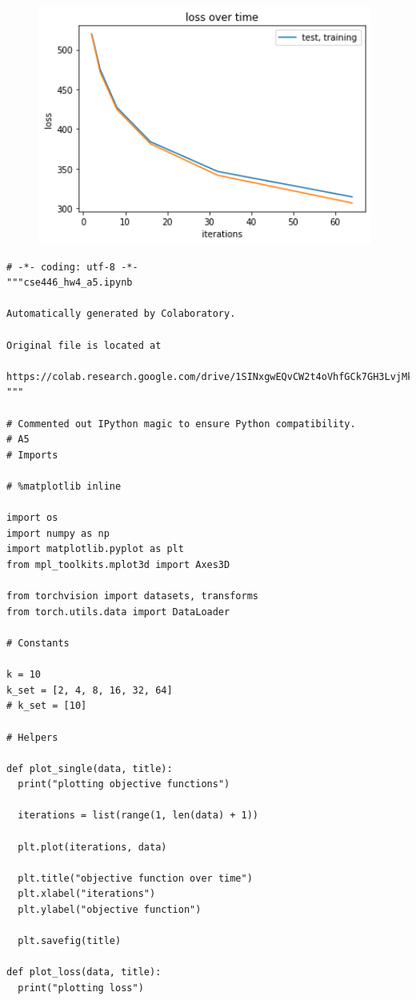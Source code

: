 \documentclass{article}
\newcommand{\1}{\mathbf{1}}
\begin{document}
{\begin{figure}[!hb]
  \centering
  \includegraphics[width=110mm]{../hw4-code/results/a5_c.png}
\end{figure}

\newpage

\begin{verbatim}
# -*- coding: utf-8 -*-
"""cse446_hw4_a5.ipynb

Automatically generated by Colaboratory.

Original file is located at
    https://colab.research.google.com/drive/1SINxgwEQvCW2t4oVhfGCk7GH3LvjMkmZ
"""

# Commented out IPython magic to ensure Python compatibility.
# A5
# Imports

# %matplotlib inline

import os
import numpy as np
import matplotlib.pyplot as plt
from mpl_toolkits.mplot3d import Axes3D

from torchvision import datasets, transforms
from torch.utils.data import DataLoader

# Constants 

k = 10
k_set = [2, 4, 8, 16, 32, 64]
# k_set = [10]

# Helpers

def plot_single(data, title):
  print("plotting objective functions")

  iterations = list(range(1, len(data) + 1))

  plt.plot(iterations, data)

  plt.title("objective function over time")
  plt.xlabel("iterations")
  plt.ylabel("objective function")

  plt.savefig(title)

def plot_loss(data, title):
  print("plotting loss")


\end{verbatim}}
\end{document}
